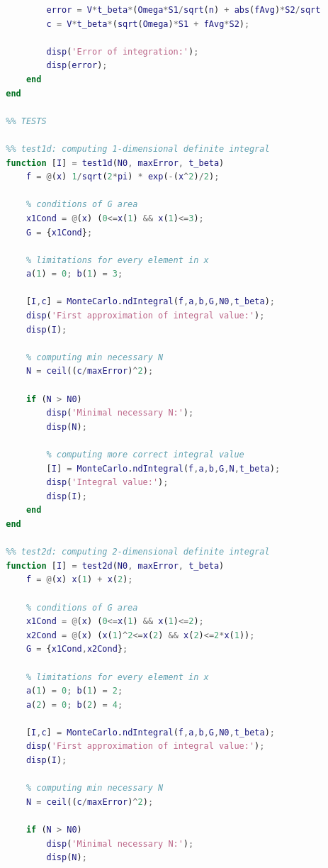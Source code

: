 \documentclass[a4paper,12pt]{article}
\begin{document}
\begin{lstlisting}[language=MATLAB]
                % computing error
                error = V*t_beta*(Omega*S1/sqrt(n) + abs(fAvg)*S2/sqrt(N));
                c = V*t_beta*(sqrt(Omega)*S1 + fAvg*S2);

                disp('Error of integration:');
                disp(error);
            end
        end
        
        %% TESTS
        
        %% test1d: computing 1-dimensional definite integral
        function [I] = test1d(N0, maxError, t_beta)
            f = @(x) 1/sqrt(2*pi) * exp(-(x^2)/2);
            
            % conditions of G area
            x1Cond = @(x) (0<=x(1) && x(1)<=3);
            G = {x1Cond};
            
            % limitations for every element in x
            a(1) = 0; b(1) = 3;
            
            [I,c] = MonteCarlo.ndIntegral(f,a,b,G,N0,t_beta);
            disp('First approximation of integral value:');
            disp(I);
            
            % computing min necessary N
            N = ceil((c/maxError)^2);
            
            if (N > N0)
                disp('Minimal necessary N:');
                disp(N);

                % computing more correct integral value
                [I] = MonteCarlo.ndIntegral(f,a,b,G,N,t_beta);
                disp('Integral value:');
                disp(I);
            end
        end
        
        %% test2d: computing 2-dimensional definite integral
        function [I] = test2d(N0, maxError, t_beta)
            f = @(x) x(1) + x(2);
            
            % conditions of G area
            x1Cond = @(x) (0<=x(1) && x(1)<=2);
            x2Cond = @(x) (x(1)^2<=x(2) && x(2)<=2*x(1));
            G = {x1Cond,x2Cond};
            
            % limitations for every element in x
            a(1) = 0; b(1) = 2;
            a(2) = 0; b(2) = 4;
            
            [I,c] = MonteCarlo.ndIntegral(f,a,b,G,N0,t_beta);
            disp('First approximation of integral value:');
            disp(I);
            
            % computing min necessary N
            N = ceil((c/maxError)^2);
            
            if (N > N0)
                disp('Minimal necessary N:');
                disp(N);


\end{lstlisting}
\end{document}
